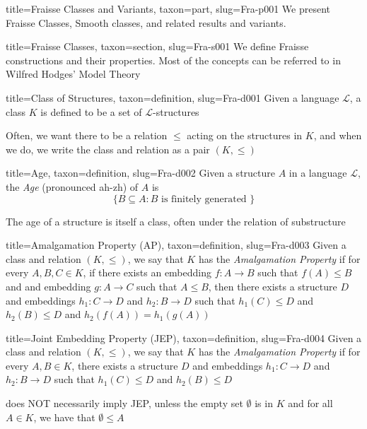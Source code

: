 \documentclass[a4paper]{article}
\begin{document}
\begin{tree}{title={Fraisse Classes and Variants}, taxon={part}, slug={Fra-p001}}
We present Fraisse Classes, Smooth classes, and related results and variants.
\begin{tree}{title={Fraisse Classes}, taxon={section}, slug={Fra-s001}}
We define Fraisse constructions and their properties. Most of the concepts can be referred to in Wilfred Hodges' Model Theory~\cite{Ref-0001}
\begin{tree}{title={Class of Structures}, taxon={definition}, slug={Fra-d001}}
Given a language \(\mathcal {L}\), a class \(K\) is defined to be a set of \(\mathcal {L}\)-structures\par{Often, we want there to be a relation \(\leq\) acting on the structures in \(K\), and when we do, we write the class and relation as a pair \((K,  \leq )\)}
\end{tree}

\begin{tree}{title={Age}, taxon={definition}, slug={Fra-d002}}
Given a structure \(A\) in a language \(\mathcal {L}\), the \emph{Age} (pronounced ah-zh) of \(A\) is \[\{ B \subseteq  A: B  \text { is finitely generated } \}\]\par{The age of a structure is itself a class, often under the relation of substructure}
\end{tree}

\begin{tree}{title={Amalgamation Property (AP)}, taxon={definition}, slug={Fra-d003}}
Given a class and relation \((K, \leq )\), we say that \(K\) has the \emph{Amalgamation Property} if for every \(A,B,C  \in  K\), if there 
exists an embedding \(f:A \rightarrow  B\) such that \(f(A)  \leq  B\) and and embedding \(g:A \rightarrow  C\) such that \(A \leq  B\), then there exists a structure \(D\) 
and embeddings \(h_1:C \rightarrow  D\) and \(h_2:B \rightarrow  D\) such that \(h_1(C) \leq  D\) and \(h_2(B)  \leq  D\) and \(h_2(f(A)) = h_1(g(A))\)
\end{tree}

\begin{tree}{title={Joint Embedding Property (JEP)}, taxon={definition}, slug={Fra-d004}}
Given a class and relation \((K, \leq )\), we say that \(K\) has the \emph{Amalgamation Property} if for every \(A,B  \in  K\), there exists a structure \(D\) 
and embeddings \(h_1:C \rightarrow  D\) and \(h_2:B \rightarrow  D\) such that \(h_1(C) \leq  D\) and \(h_2(B)  \leq  D\)\par{ does NOT necessarily imply JEP, unless the empty set \(\emptyset\) is in \(K\) and for all \(A \in  K\), we have that \(\emptyset   \leq  A\)}
\end{tree}


\end{tree}
\end{tree}
\end{document}
